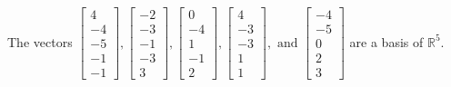 \begin{exercise}
\begin{exerciseStatement}
  \end{exerciseStatement}
  \begin{exerciseAnswer}
   The vectors \(\left[\begin{array}{r}
4 \\
-4 \\
-5 \\
-1 \\
-1
\end{array}\right] , \left[\begin{array}{r}
-2 \\
-3 \\
-1 \\
-3 \\
3
\end{array}\right] , \left[\begin{array}{r}
0 \\
-4 \\
1 \\
-1 \\
2
\end{array}\right] , \left[\begin{array}{r}
4 \\
-3 \\
-3 \\
1 \\
1
\end{array}\right] , \text{ and } \left[\begin{array}{r}
-4 \\
-5 \\
0 \\
2 \\
3
\end{array}\right]\) 
  	 are  a basis of \(\mathbb{R}^5\).
  


  \end{exerciseAnswer}
\end{exercise}